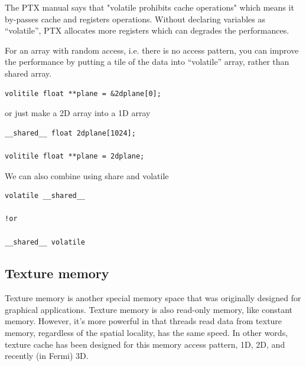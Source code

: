 \begin{framed}
The PTX manual says that "volatile prohibits cache operations" which 
means it by-passes cache and registers operations. Without declaring variables
as ``volatile'', PTX allocates more registers which can degrades the
performances. 
\end{framed}

For an array with random access, i.e. there is no access pattern, you can
improve the performance by putting a tile of the data into ``volatile'' array,
rather than shared array. 
\begin{verbatim}
volitile float **plane = &2dplane[0];
\end{verbatim}
or just make a 2D array into a 1D array
\begin{verbatim}
__shared__ float 2dplane[1024];

volitile float **plane = 2dplane;
\end{verbatim}
We can also combine using share and volatile
\begin{verbatim}
volatile __shared__ 

!or

__shared__ volatile
\end{verbatim}


\subsection{Texture memory}
\label{sec:cudac_texture}

Texture memory is another special memory space that was originally designed for
graphical applications. Texture memory is also read-only memory, like constant
memory. However, it's more powerful in that threads read data from texture
memory, regardless of the spatial locality, has the same speed. In other words,
texture cache has been designed for this memory access pattern, 1D, 2D, and
recently (in Fermi) 3D.

